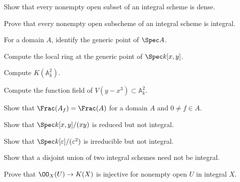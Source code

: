 \begin{exercise}\label{exer:vi27-01}Show that every nonempty open subset of an integral scheme is dense.\end{exercise}

\begin{exercise}\label{exer:vi27-02}Prove that every nonempty open subscheme of an integral scheme is integral.\end{exercise}

\begin{exercise}\label{exer:vi27-03}For a domain $A$, identify the generic point of $\Spec A$.\end{exercise}

\begin{exercise}\label{exer:vi27-04}Compute the local ring at the generic point of $\Spec k[x,y]$.\end{exercise}

\begin{exercise}\label{exer:vi27-05}Compute $K(\mathbb A^2_k)$.\end{exercise}

\begin{exercise}\label{exer:vi27-06}Compute the function field of $V(y-x^3)\subset\mathbb A^2_k$.\end{exercise}

\begin{exercise}\label{exer:vi27-07}Show that $\Frac(A_f)=\Frac(A)$ for a domain $A$ and $0\ne f\in A$.\end{exercise}

\begin{exercise}\label{exer:vi27-08}Show that $\Spec k[x,y]/(xy)$ is reduced but not integral.\end{exercise}

\begin{exercise}\label{exer:vi27-09}Show that $\Spec k[\varepsilon]/(\varepsilon^2)$ is irreducible but not integral.\end{exercise}

\begin{exercise}\label{exer:vi27-10}Show that a disjoint union of two integral schemes need not be integral.\end{exercise}

\begin{exercise}\label{exer:vi27-11}Prove that $\OO_X(U)\to K(X)$ is injective for nonempty open $U$ in integral $X$.\end{exercise}

